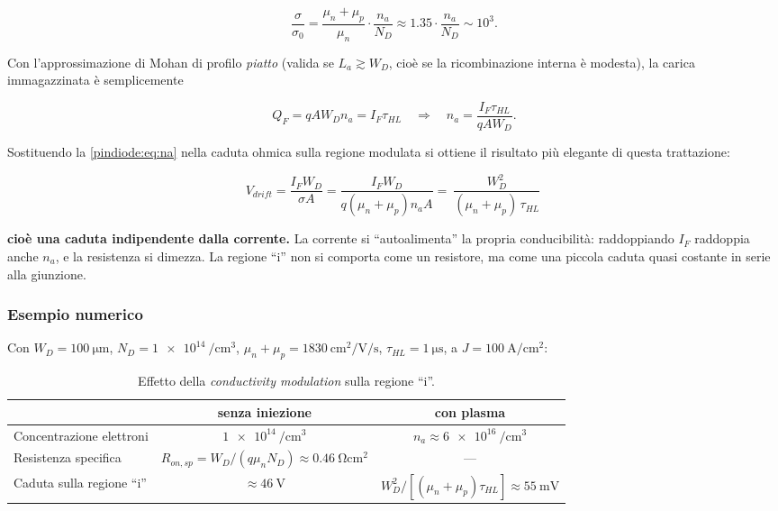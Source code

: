 \begin{equation}
\frac{\sigma}{\sigma_0} = \frac{\mu_n + \mu_p}{\mu_n}\cdot\frac{n_a}{N_D}
\approx 1.35 \cdot \frac{n_a}{N_D} \sim 10^{3} .
\end{equation}

Con l'approssimazione di Mohan di profilo \emph{piatto} (valida se
$L_a \gtrsim W_D$, cioè se la ricombinazione interna è modesta), la carica
immagazzinata è semplicemente

\begin{equation}
Q_F = q A W_D n_a = I_F \tau_{HL}
\quad\Longrightarrow\quad
n_a = \frac{I_F \tau_{HL}}{q A W_D} .
\label{pindiode:eq:na}
\end{equation}

Sostituendo la \eqref{pindiode:eq:na} nella caduta ohmica sulla regione modulata si
ottiene il risultato più elegante di questa trattazione:

\begin{equation}
V_{drift} = \frac{I_F W_D}{\sigma A}
= \frac{I_F W_D}{q(\mu_n+\mu_p) n_a A}
= \boxed{\ \frac{W_D^{2}}{(\mu_n + \mu_p)\, \tau_{HL}}\ }
\label{pindiode:eq:vdrift}
\end{equation}

\noindent
\textbf{cioè una caduta indipendente dalla corrente.} La corrente si
``autoalimenta'' la propria conducibilità: raddoppiando $I_F$ raddoppia anche
$n_a$, e la resistenza si dimezza. La regione ``i'' non si comporta come un
resistore, ma come una piccola caduta quasi costante in serie alla giunzione.

\subsubsection*{Esempio numerico}

Con $W_D = \SI{100}{\micro\meter}$, $N_D = \SI{1e14}{\per\centi\meter\cubed}$,
$\mu_n + \mu_p = \SI{1830}{\centi\meter\squared\per\volt\per\second}$,
$\tau_{HL} = \SI{1}{\micro\second}$, a
$J = \SI{100}{\ampere\per\centi\meter\squared}$:

\begin{table}[htbp]
\centering
\caption{Effetto della \emph{conductivity modulation} sulla regione ``i''.}
\begin{tabular}{lcc}
\toprule
 & senza iniezione & con plasma \\
\midrule
Concentrazione elettroni & $\SI{1e14}{\per\centi\meter\cubed}$ & $n_a \approx \SI{6e16}{\per\centi\meter\cubed}$ \\
Resistenza specifica & $R_{on,sp} = W_D/(q\mu_n N_D) \approx \SI{0.46}{\ohm\centi\meter\squared}$ & --- \\
Caduta sulla regione ``i'' & $\approx \SI{46}{\volt}$ & $W_D^2/[(\mu_n+\mu_p)\tau_{HL}] \approx \SI{55}{\milli\volt}$ \\
\bottomrule
\end{tabular}
\end{table}

